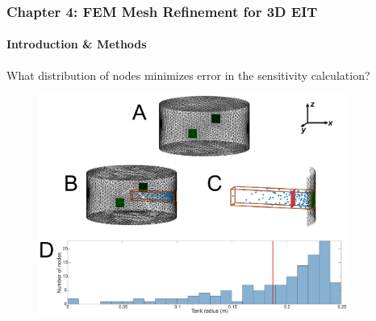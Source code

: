 \documentclass[10pt,    %
    english,            %
    xcolor=table,       %
    envcountsect,        %
    aspectratio=1610
]{beamer}
\begin{document}
\begin{frame}
	\frametitle{Chapter 4: FEM Mesh Refinement for 3D EIT}
	\framesubtitle{Introduction \& Methods}
	What distribution of nodes minimizes error in the sensitivity calculation?
	\begin{figure}
		\centering
	\includegraphics[width=0.9\textwidth,trim={0 0cm 0 10cm},clip]{balance_methods.pdf}
	\end{figure}
\end{frame}
\end{document}

